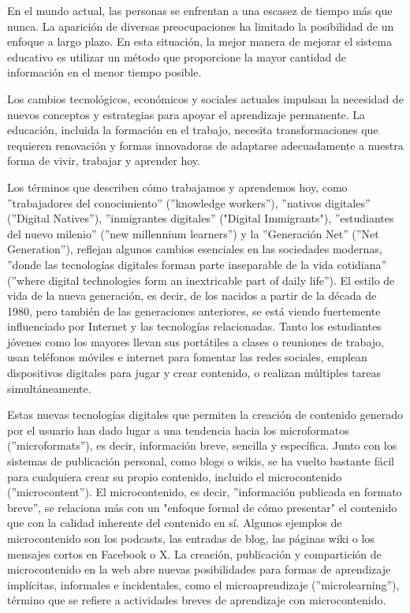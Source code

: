 
En el mundo actual, las personas se enfrentan a una escasez de tiempo más que
nunca. La aparición de diversas preocupaciones ha limitado la posibilidad de un
enfoque a largo plazo. En esta situación, la mejor manera de mejorar el sistema
educativo es utilizar un método que proporcione la mayor cantidad de información
en el menor tiempo posible.
\cite{article:microlearning_today_students_nikkhoo}

Los cambios tecnológicos, económicos y sociales actuales impulsan la necesidad
de nuevos conceptos y estrategias para apoyar el aprendizaje permanente. La
educación, incluida la formación en el trabajo, necesita transformaciones que
requieren renovación y formas innovadoras de adaptarse adecuadamente a nuestra
forma de vivir, trabajar y aprender hoy.
\cite{article:microlearning_buchem}

Los términos que describen cómo trabajamos y aprendemos hoy, como ''trabajadores
del conocimiento'' (''knowledge workers''), ''nativos digitales'' (''Digital
Natives''), ''inmigrantes digitales'' ("Digital Immigrants"), ''estudiantes del
nuevo milenio'' (''new millennium learners'') y la ''Generación Net'' (''Net
Generation''), reflejan algunos cambios esenciales en las sociedades modernas,
''donde las tecnologías digitales forman parte inseparable de la vida cotidiana''
(''where digital technologies form an inextricable part of daily life''). El
estilo de vida de la nueva generación, es decir, de los nacidos a partir de la
década de 1980, pero también de las generaciones anteriores, se está viendo
fuertemente influenciado por Internet y las tecnologías relacionadas. Tanto los
estudiantes jóvenes como los mayores llevan sus portátiles a clases o reuniones
de trabajo, usan teléfonos móviles e internet para fomentar las redes sociales,
emplean dispositivos digitales para jugar y crear contenido, o realizan
múltiples tareas simultáneamente.
\cite{article:microlearning_buchem}

Estas nuevas tecnologías digitales que permiten la creación de contenido
generado por el usuario han dado lugar a una tendencia hacia los microformatos
(''microformats''), es decir, información breve, sencilla y específica. Junto con
los sistemas de publicación personal, como blogs o wikis, se ha vuelto bastante
fácil para cualquiera crear su propio contenido, incluido el microcontenido
(''microcontent''). El microcontenido, es decir, ''información publicada en formato
breve'', se relaciona más con un "enfoque formal de cómo presentar" el contenido
que con la calidad inherente del contenido en sí. Algunos ejemplos de
microcontenido son los podcasts, las entradas de blog, las páginas wiki o los
mensajes cortos en Facebook o X. La creación, publicación y compartición de
microcontenido en la web abre nuevas posibilidades para formas de aprendizaje
implícitas, informales e incidentales, como el microaprendizaje
(''microlearning''), término que se refiere a actividades breves de aprendizaje
con microcontenido.
\cite{article:microlearning_buchem}